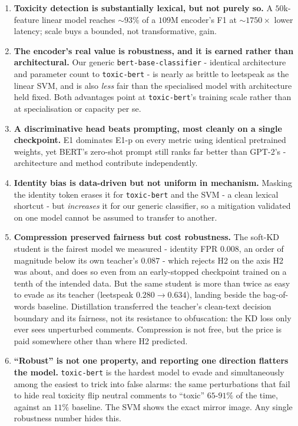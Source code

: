 \documentclass[10pt,a4paper]{article}
\begin{document}
\begin{enumerate}
\item \textbf{Toxicity detection is substantially lexical, but not purely so.} A
$50$k-feature linear model reaches ${\sim}93\%$ of a $109$M encoder's F1 at
${\sim}1750\times$ lower latency; scale buys a bounded, not transformative, gain.

\item \textbf{The encoder's real value is robustness, and it is earned rather than
architectural.} Our generic \texttt{bert-base-classifier} - identical architecture
and parameter count to \texttt{toxic-bert} - is nearly as brittle to leetspeak as
the linear SVM, and is also \emph{less} fair than the specialised model with
architecture held fixed. Both advantages point at \texttt{toxic-bert}'s training
scale rather than at specialisation or capacity per se.

\item \textbf{A discriminative head beats prompting, most cleanly on a single
checkpoint.} E1 dominates E1-p on every metric using identical pretrained weights,
yet BERT's zero-shot prompt still ranks far better than GPT-2's - architecture and
method contribute independently.

\item \textbf{Identity bias is data-driven but not uniform in mechanism.} Masking
the identity token erases it for \texttt{toxic-bert} and the SVM - a clean lexical
shortcut - but \emph{increases} it for our generic classifier, so a mitigation
validated on one model cannot be assumed to transfer to another.

\item \textbf{Compression preserved fairness but cost robustness.} The soft-KD
student is the fairest model we measured - identity FPR $0.008$, an order of
magnitude below its own teacher's $0.087$ - which rejects H2 on the axis H2 was
about, and does so even from an early-stopped checkpoint trained on a tenth of
the intended data. But the same student is more than twice as easy to evade as
its teacher (leetspeak $0.280 \to 0.634$), landing beside the bag-of-words
baseline. Distillation transferred the teacher's clean-text decision boundary and
its fairness, not its resistance to obfuscation: the KD loss only ever sees
unperturbed comments. Compression is not free, but the price is paid somewhere
other than where H2 predicted.

\item \textbf{``Robust'' is not one property, and reporting one direction
flatters the model.} \texttt{toxic-bert} is the hardest model to evade and
simultaneously among the easiest to trick into false alarms: the same
perturbations that fail to hide real toxicity flip neutral comments to ``toxic''
$65$-$91\%$ of the time, against an $11\%$ baseline. The SVM shows the exact
mirror image. Any single robustness number hides this.


\end{enumerate}
\end{document}
